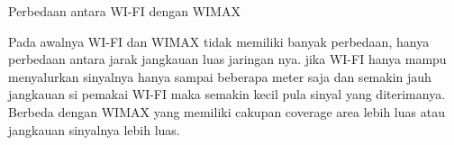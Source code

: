 Perbedaan antara WI-FI dengan WIMAX

Pada awalnya WI-FI dan WIMAX tidak memiliki banyak perbedaan, hanya perbedaan antara jarak jangkauan luas jaringan nya.
jika WI-FI hanya mampu menyalurkan sinyalnya hanya sampai beberapa meter saja dan semakin jauh jangkauan si pemakai WI-FI maka
semakin kecil pula sinyal yang diterimanya. Berbeda dengan WIMAX yang memiliki cakupan coverage area lebih luas atau jangkauan 
sinyalnya lebih luas.